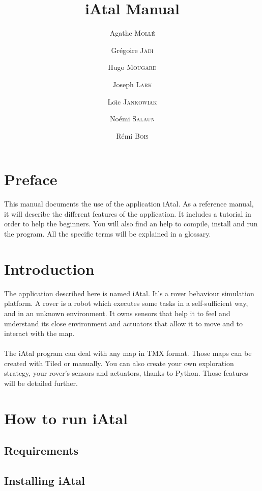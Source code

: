\documentclass[a4paper,11pt]{article}
\title{iAtal Manual}
\author{Agathe \textsc{Moll\'e} \and Gr\'egoire \textsc{Jadi} \and Hugo \textsc{Mougard} \and Joseph \textsc{Lark} 
\and Lo\"\i c \textsc{Jankowiak} \and No\'emi \textsc{Sala\"un} \and R\'emi \textsc{Bois}}
\date{}
\begin{document}
\maketitle


\section*{Preface}
  This manual documents the use of the application iAtal.
  As a reference manual, it will describe the different features of the application. It includes a tutorial
  in order to help the beginners. You will also find an help to compile, install and run the program.
  All the specific terms will be explained in a glossary.
  
\section*{Introduction}
  The application described here is named iAtal. It's a rover behaviour simulation platform.
  A rover is a robot which executes some tasks in a self-sufficient way, and in an unknown environment.
  It owns sensors that help it to feel and understand its close environment and actuators that allow it
  to move and to interact with the map.
  \paragraph{}
  The iAtal program can deal with any map in TMX format. Those maps can be created with Tiled %
  or manually.
  You can also create your own exploration strategy, your rover's sensors and actuators, thanks to Python.
  Those features will be detailed further.

\section{How to run iAtal}

  \subsection{Requirements}

  \subsection{Installing iAtal}
\end{document}
